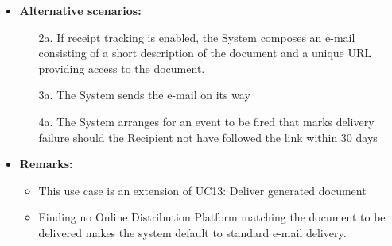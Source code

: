 \documentclass[a4paper,10pt]{article}
\begin{document}
\begin{itemize}
    \item \textbf{Alternative scenarios:} 
    \begin{enumerate}
        \item [2a.] If receipt tracking is enabled, the System composes an e-mail consisting of a short description of the document and a unique URL providing access to the document.
        \item [3a.] The System sends the e-mail on its way
        \item [4a.] The System arranges for an event to be fired that marks delivery failure should the Recipient not have followed the link within 30 days
    \end{enumerate}
    
    \item \textbf{Remarks:}
        \begin{itemize}
            \item This use case is an extension of UC13: Deliver generated document
            \item Finding no Online Distribution Platform matching the document to be delivered makes the system default to standard e-mail delivery.
        \end{itemize}
\end{itemize}
\end{document}
